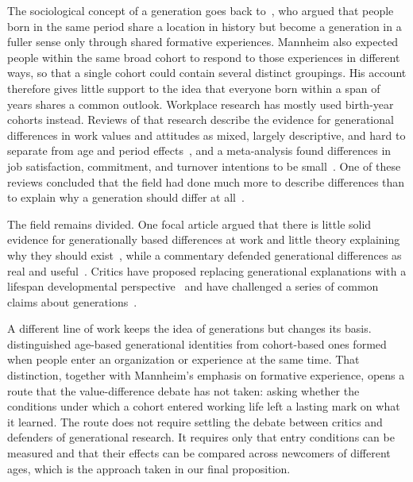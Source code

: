 \documentclass[12pt,a4paper]{article}
\theoremstyle{definition}
\begin{document}
The sociological concept of a generation goes back to~\citet{mannheim1952problem}, who argued that people born in the same period share a location in history but become a generation in a fuller sense only through shared formative experiences. Mannheim also expected people within the same broad cohort to respond to those experiences in different ways, so that a single cohort could contain several distinct groupings. His account therefore gives little support to the idea that everyone born within a span of years shares a common outlook. Workplace research has mostly used birth-year cohorts instead. Reviews of that research describe the evidence for generational differences in work values and attitudes as mixed, largely descriptive, and hard to separate from age and period effects~\citep{parry2011generational,lyons2014generational}, and a meta-analysis found differences in job satisfaction, commitment, and turnover intentions to be small~\citep{costanza2012generational}. One of these reviews concluded that the field had done much more to describe differences than to explain why a generation should differ at all~\citep{lyons2014generational}.

The field remains divided. One focal article argued that there is little solid evidence for generationally based differences at work and little theory explaining why they should exist~\citep{costanza2015generationally}, while a commentary defended generational differences as real and useful~\citep{campbell2015generational}. Critics have proposed replacing generational explanations with a lifespan developmental perspective~\citep{rudolph2017considering} and have challenged a series of common claims about generations~\citep{rudolph2021generations}.

A different line of work keeps the idea of generations but changes its basis. \citet{joshi2010unpacking} distinguished age-based generational identities from cohort-based ones formed when people enter an organization or experience at the same time. That distinction, together with Mannheim's emphasis on formative experience, opens a route that the value-difference debate has not taken: asking whether the conditions under which a cohort entered working life left a lasting mark on what it learned. The route does not require settling the debate between critics and defenders of generational research. It requires only that entry conditions can be measured and that their effects can be compared across newcomers of different ages, which is the approach taken in our final proposition.
\end{document}
